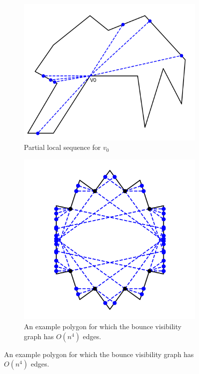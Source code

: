 \documentclass[]{styles/svproc}  %
\begin{document}
\begin{figure}[h]
\centering
\begin{subfigure}{0.4\textwidth}
    \centering
    \includegraphics[width=\linewidth]{figures/partial_local_sequence.png}
    \caption{Partial local sequence for $v_0$}\label{fig:pls}
\end{subfigure}%
\begin{subfigure}{0.4\textwidth}
    \centering
    \includegraphics[width=\linewidth]{figures/chestnut_5.png}
    \caption{An example polygon for which the bounce visibility graph has
$O(n^4)$ edges. \label{fig:t4}}
\end{subfigure}
\end{figure}
\end{document}
